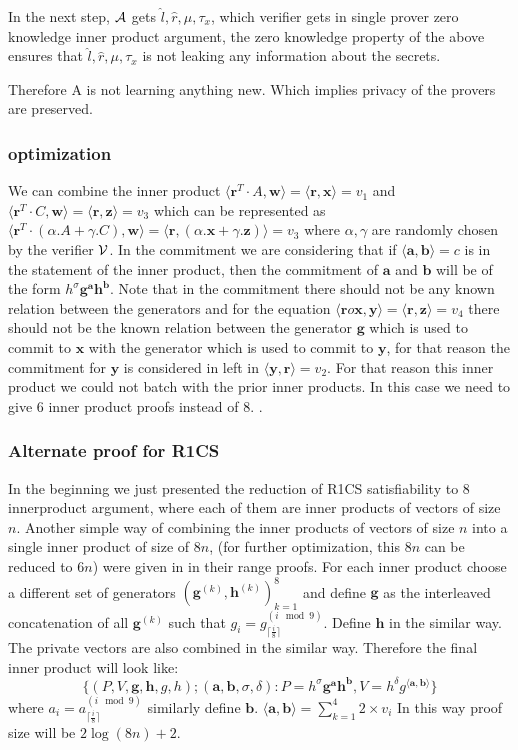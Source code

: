 In the next step, ${\cal A}$ gets $\hat{l}, \hat{r}, \mu, \tau_x$, which verifier gets in single prover zero knowledge inner product argument, the zero knowledge property of the above ensures that $\hat{l}, \hat{r}, \mu, \tau_x$ is not leaking any information about the secrets.

Therefore A is not learning anything new. Which implies privacy of the provers are preserved.

\subsubsection{optimization}
We can combine the inner product $\langle \bm{r}^T \cdot A, \bm{w}\rangle = \langle \bm{r}, \bm{x} \rangle =v_1$ and $\langle \bm{r}^T \cdot C, \bm{w}\rangle = \langle \bm{r}, \bm{z} \rangle =v_3$ which can be represented as $\langle \bm{r}^T \cdot(\alpha.A+\gamma.C), \bm{w}\rangle = \langle \bm{r}, (\alpha.\bm{x}+\gamma.\bm{z}) \rangle =v_3$ where $\alpha, \gamma$ are randomly chosen by the verifier ${\cal V}$. In the commitment we are considering that if $\langle \bm{a},\bm{b}\rangle= c$ is in the statement of the inner product, then the commitment of $\bm{a}$ and $\bm{b}$ will be of the form $h^{\sigma} \bm{g}^{\bm{a}} \bm{h}^{\bm{b}}$. Note that in the commitment there should not be any known relation between the generators and for the equation $\langle \bm{r} o \bm{x}, \bm{y} \rangle = \langle \bm{r}, \bm{z} \rangle =v_4$ there should not be the known relation between the generator $\bm{g}$ which is used to commit to $\bm{x}$ with the generator which is used to commit to $\bm{y}$, for that reason the commitment for $\bm{y}$ is considered in left in $\langle \bm{y}, \bm{r} \rangle = v_2$. For that reason this inner product we could not batch with the prior inner products. In this case we need to give 6 inner product proofs instead of 8. 
.
\subsubsection{Alternate proof for R1CS}
In the beginning we just presented the reduction of R1CS satisfiability to 8 innerproduct argument, where each of them are inner products of vectors of size $n$. Another simple way of combining the inner products of vectors of size $n$ into a single inner product of size of $8n$, (for further optimization, this $8n$ can be reduced to $6n$) were given in \cite{Bulletproofs} in their range proofs. 
For each inner product choose a different set of generators $(\bm{g}^{(k)},\bm{h}^{(k)})_{k=1}^{8}$ and define $\bm{g}$ as the interleaved concatenation of all $\bm{g}^{(k)}$ such that $g_i=g_{\lceil \frac{i}{8} \rceil}^{(i \mod 9)}$. Define $\bm{h}$ in the similar way. The private vectors are also combined in the similar way. Therefore the final inner product will look like:
$$\{(P,V,\bm{g},\bm{h},g,h);(\bm{a},\bm{b},\sigma,\delta): P=h^{\sigma}\bm{g}^{\bm{a}}\bm{h}^{\bm{b}}, V=h^{\delta}g^{\langle \bm{a},\bm{b}\rangle}\}$$
where $a_i= a_{\lceil \frac{i}{8} \rceil}^{(i \mod 9)}$ similarly define $\bm{b}$. $\langle\bm{a},\bm{b}\rangle=\sum_{k=1}^{4}2\times v_i$
In this way proof size will be $2\log (8n) + 2$.


